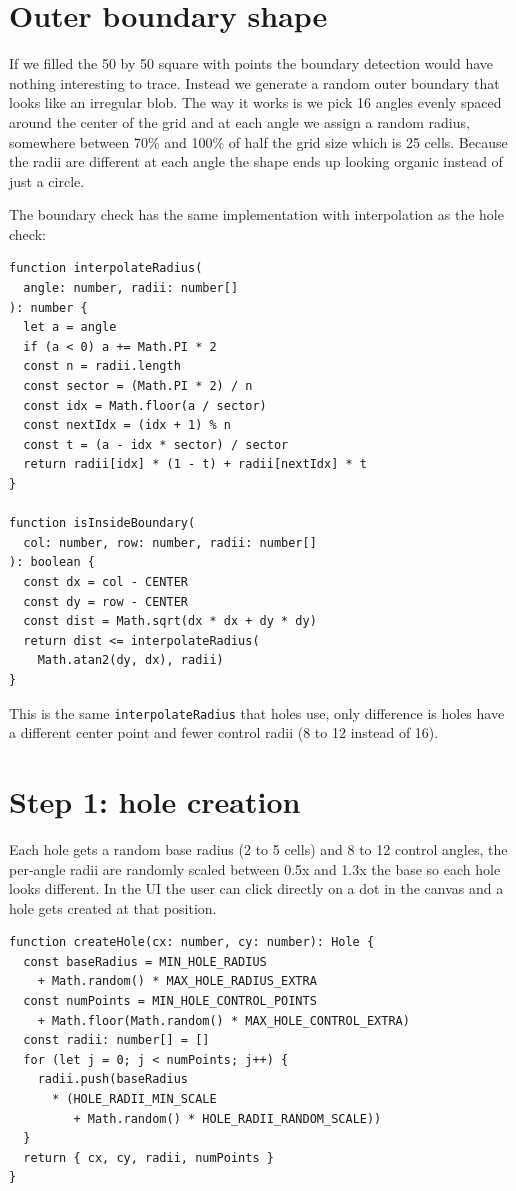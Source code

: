 \documentclass[12pt]{extreport}
\begin{document}
\section{Outer boundary shape}

If we filled the 50 by 50 square with points the boundary detection would have nothing interesting to trace. Instead we generate a random outer boundary that looks like an irregular blob. The way it works is we pick 16 angles evenly spaced around the center of the grid and at each angle we assign a random radius, somewhere between 70\% and 100\% of half the grid size which is 25 cells. Because the radii are different at each angle the shape ends up looking organic instead of just a circle.

The boundary check has the same implementation with interpolation as the hole check:

\begin{lstlisting}[style=tsstyle, caption={Boundary check (\texttt{grid.ts})}]
function interpolateRadius(
  angle: number, radii: number[]
): number {
  let a = angle
  if (a < 0) a += Math.PI * 2
  const n = radii.length
  const sector = (Math.PI * 2) / n
  const idx = Math.floor(a / sector)
  const nextIdx = (idx + 1) % n
  const t = (a - idx * sector) / sector
  return radii[idx] * (1 - t) + radii[nextIdx] * t
}

function isInsideBoundary(
  col: number, row: number, radii: number[]
): boolean {
  const dx = col - CENTER
  const dy = row - CENTER
  const dist = Math.sqrt(dx * dx + dy * dy)
  return dist <= interpolateRadius(
    Math.atan2(dy, dx), radii)
}
\end{lstlisting}

This is the same \texttt{interpolateRadius} that holes use, only difference is holes have a different center point and fewer control radii (8 to 12 instead of 16).

\section{Step 1: hole creation}

Each hole gets a random base radius (2 to 5 cells) and 8 to 12 control angles, the per-angle radii are randomly scaled between 0.5x and 1.3x the base so each hole looks different. In the UI the user can click directly on a dot in the canvas and a hole gets created at that position.

\begin{lstlisting}[style=tsstyle, caption={Hole creation (\texttt{grid.ts})}]
function createHole(cx: number, cy: number): Hole {
  const baseRadius = MIN_HOLE_RADIUS
    + Math.random() * MAX_HOLE_RADIUS_EXTRA
  const numPoints = MIN_HOLE_CONTROL_POINTS
    + Math.floor(Math.random() * MAX_HOLE_CONTROL_EXTRA)
  const radii: number[] = []
  for (let j = 0; j < numPoints; j++) {
    radii.push(baseRadius
      * (HOLE_RADII_MIN_SCALE
         + Math.random() * HOLE_RADII_RANDOM_SCALE))
  }
  return { cx, cy, radii, numPoints }
}
\end{lstlisting}
\end{document}
